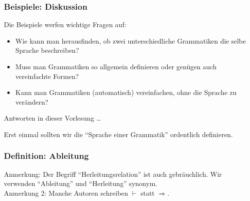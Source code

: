 \documentclass[onlymath]{beamer}
\begin{document}
\begin{frame}\frametitle{Beispiele: Diskussion}

Die Beispiele werfen \alert{wichtige Fragen} auf:
\begin{itemize}
\item Wie kann man herausfinden, ob zwei unterschiedliche Grammatiken die selbe Sprache beschreiben?
\item Muss man Grammatiken so allgemein definieren oder genügen auch vereinfachte Formen?
\item Kann man Grammatiken (automatisch) vereinfachen, ohne die Sprache zu verändern?
\end{itemize}

Antworten in dieser Vorlesung \ldots\bigskip

Erst einmal sollten wir die \alert{"`Sprache einer Grammatik"'} ordentlich definieren.

\end{frame}

\begin{frame}\frametitle{Definition: Ableitung}


\medskip


{\footnotesize \textcolor{devilscss}{Anmerkung: Der Begriff "`Herleitungsrelation"' ist auch gebräuchlich. Wir verwenden "`Ableitung"' und "`Herleitung"' synonym.\\
Anmerkung 2: Manche Autoren schreiben $\vdash$ statt $\Rightarrow$.}}

\end{frame}
\end{document}
